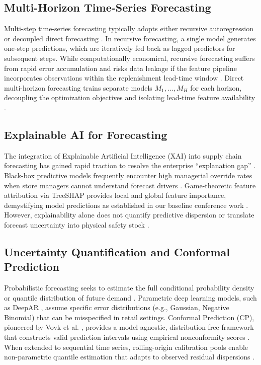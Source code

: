 \documentclass[11pt,a4paper]{article}
\begin{document}
\subsection{Multi-Horizon Time-Series Forecasting}
\label{sec:related_multihorizon}
Multi-step time-series forecasting typically adopts either recursive autoregression or decoupled direct forecasting \cite{tiwari2026explainable}. In recursive forecasting, a single model generates one-step predictions, which are iteratively fed back as lagged predictors for subsequent steps. While computationally economical, recursive forecasting suffers from rapid error accumulation and risks data leakage if the feature pipeline incorporates observations within the replenishment lead-time window \cite{tiwari2026explainable}. Direct multi-horizon forecasting trains separate models $M_1, \dots, M_H$ for each horizon, decoupling the optimization objectives and isolating lead-time feature availability \cite{tiwari2026explainable}.

\subsection{Explainable AI for Forecasting}
\label{sec:related_xai}
The integration of Explainable Artificial Intelligence (XAI) into supply chain forecasting has gained rapid traction to resolve the enterprise ``explanation gap'' \cite{lin2026critical, chaganti2026}. Black-box predictive models frequently encounter high managerial override rates when store managers cannot understand forecast drivers \cite{chang2025explainable, narlawar2025explainable}. Game-theoretic feature attribution via TreeSHAP \cite{lundberg2017unified, madabhushini2025} provides local and global feature importance, demystifying model predictions as established in our baseline conference work \cite{e_idss_ieee}. However, explainability alone does not quantify predictive dispersion or translate forecast uncertainty into physical safety stock \cite{lin2026critical}.

\subsection{Uncertainty Quantification and Conformal Prediction}
\label{sec:related_conformal}
Probabilistic forecasting seeks to estimate the full conditional probability density or quantile distribution of future demand \cite{gneiting2007strictly}. Parametric deep learning models, such as DeepAR \cite{salinas2020deepar}, assume specific error distributions (e.g., Gaussian, Negative Binomial) that can be misspecified in retail settings. Conformal Prediction (CP), pioneered by Vovk et al. \cite{vovk2005algorithmic}, provides a model-agnostic, distribution-free framework that constructs valid prediction intervals using empirical nonconformity scores \cite{angelopoulos2021gentle}. When extended to sequential time series, rolling-origin calibration pools enable non-parametric quantile estimation that adapts to observed residual dispersions \cite{stankeviciute2021conformal, huber2019integrating}.
\end{document}

